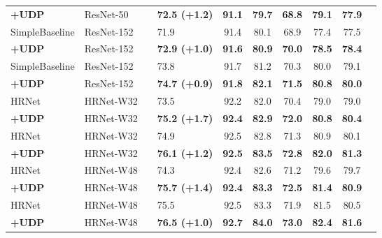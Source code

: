 \documentclass[10pt,journal,compsoc]{IEEEtran}
\begin{document}
\begin{table*}
\begin{center}
\begin{tabular}{l|l|c|lcccccc}
\textbf{+UDP}                                         & ResNet-50     &       &\textbf{72.5 (+1.2)}    &\textbf{91.1}           &\textbf{79.7}           &\textbf{68.8}         &\textbf{79.1}          &\textbf{77.9}\\
SimpleBaseline\cite{CPN}           & ResNet-152   &       &71.9       & 91.4            & 80.1             & 68.9            &77.4            &77.5\\
\textbf{+UDP}                                         & ResNet-152  &       &\textbf{72.9 (+1.0)}    &\textbf{91.6}           &\textbf{80.9}           &\textbf{70.0}         &\textbf{78.5}          &\textbf{78.4}\\
SimpleBaseline\cite{CPN}           & ResNet-152   &       &73.8       & 91.7            & 81.2             & 70.3            &80.0            &79.1\\
\textbf{+UDP}                                         & ResNet-152   &       &\textbf{74.7 (+0.9)}    &\textbf{91.8}           &\textbf{82.1}           &\textbf{71.5}         &\textbf{80.8}          &\textbf{80.0}\\
\hline
HRNet\cite{HRNet}                  & HRNet-W32        &       &73.5     & 92.2          & 82.0       & 70.4        &79.0         &79.0\\
\textbf{+UDP}                                     & HRNet-W32        &       &\textbf{75.2 (+1.7)}   & \textbf{92.4}        &\textbf{82.9}     & \textbf{72.0}      &\textbf{80.8}      &\textbf{80.4}\\
HRNet\cite{HRNet}                  & HRNet-W32        &     &74.9     & 92.5          & 82.8       & 71.3        &80.9         &80.1\\
\textbf{+UDP}                                     & HRNet-W32        &       &\textbf{76.1 (+1.2)}   &\textbf{92.5}        & \textbf{83.5}    & \textbf{72.8}      &\textbf{82.0}      &\textbf{81.3}\\
HRNet\cite{HRNet}                 & HRNet-W48        &       &74.3     & 92.4          & 82.6       & 71.2        &79.6         &79.7\\
\textbf{+UDP}                                     & HRNet-W48        &       &\textbf{75.7 (+1.4)}   & \textbf{92.4}        & \textbf{83.3}    &\textbf{ 72.5}      &\textbf{81.4}      &\textbf{80.9}\\
HRNet\cite{HRNet}                  & HRNet-W48        &       &75.5      & 92.5          & 83.3      & 71.9        &81.5         &80.5\\
\textbf{+UDP}                                     & HRNet-W48        &      &\textbf{76.5 (+1.0)}   & \textbf{92.7}        & \textbf{84.0}    & \textbf{73.0}     &\textbf{82.4}      &\textbf{81.6}\\


\hline
\end{tabular}
\end{center}
\end{table*}
\end{document}
